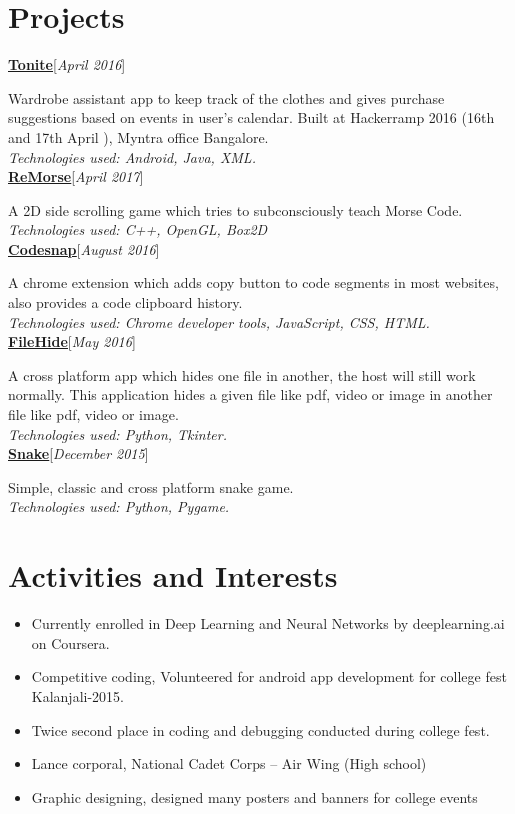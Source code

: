 \documentclass[11pt]{article}
\begin{document}
\section{Projects}

\textbf{\underline{\large\href{https://github.com/abhijith0505/Tonite}{Tonite}}}\hfill[\textit{April 2016}]\par
Wardrobe assistant app to keep track of the clothes and gives purchase suggestions based on events in user's calendar. Built at Hackerramp 2016 (16th and 17th April ), Myntra office Bangalore.\\
\textit{Technologies used:  Android, Java, XML.}\smallskip\\
\textbf{\underline{\large\href{https://github.com/RaghavaDhanya/ReMorse}{ReMorse}}}\hfill[\textit{April 2017}]\par
A 2D side scrolling game which tries to subconsciously teach Morse Code.\\
\textit{Technologies used:  C++, OpenGL, Box2D}\smallskip\\
\textbf{\underline{\large\href{https://github.com/RaghavaDhanya/Codesnap}{Codesnap}}}\hfill[\textit{August 2016}]\par
A chrome extension which adds copy button to code segments in most websites, also provides a code clipboard history.\\
\textit{Technologies used: Chrome developer tools, JavaScript, CSS, HTML. }\smallskip\\
\textbf{\underline{\large\href{https://github.com/RaghavaDhanya/FileHide}{FileHide}}}\hfill[\textit{May 2016}]\par
A cross platform app which hides one file in another, the host will still work normally. This application hides a given file like pdf, video or image in another file like pdf, video or image.\\
\textit{Technologies used: Python, Tkinter.}\smallskip\\
\textbf{\underline{\large\href{https://github.com/RaghavaDhanya/Snake}{Snake}}}\hfill[\textit{December 2015}]\par
Simple, classic and cross platform snake game.\\
\textit{Technologies used: Python, Pygame.}

\section{Activities and Interests}
\begin{itemize}
	\itemsep0em
	\item Currently enrolled in Deep Learning and Neural Networks by deeplearning.ai on Coursera. 
	\item Competitive coding, Volunteered for android app development for college fest Kalanjali-2015.
	\item Twice second place in coding and debugging conducted during college fest.
	\item Lance corporal, National Cadet Corps – Air Wing (High school)
	\item Graphic designing, designed many posters and banners for college events
\end{itemize}
\end{document}
